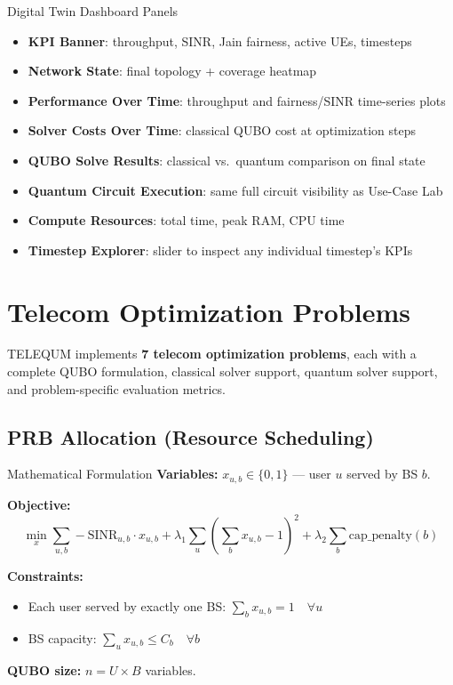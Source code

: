 \documentclass[11pt,a4paper]{article}
\begin{document}
\begin{featurebox}{Digital Twin Dashboard Panels}
\begin{itemize}
  \item \textbf{KPI Banner}: throughput, SINR, Jain fairness, active UEs, timesteps
  \item \textbf{Network State}: final topology + coverage heatmap
  \item \textbf{Performance Over Time}: throughput and fairness/SINR time-series plots
  \item \textbf{Solver Costs Over Time}: classical QUBO cost at optimization steps
  \item \textbf{QUBO Solve Results}: classical vs.\ quantum comparison on final state
  \item \textbf{Quantum Circuit Execution}: same full circuit visibility as Use-Case Lab
  \item \textbf{Compute Resources}: total time, peak RAM, CPU time
  \item \textbf{Timestep Explorer}: slider to inspect any individual timestep's KPIs
\end{itemize}
\end{featurebox}


\section{Telecom Optimization Problems}
\label{sec:problems}

TELEQUM implements \textbf{7 telecom optimization problems}, each with a complete QUBO formulation, classical solver support, quantum solver support, and problem-specific evaluation metrics.

\subsection{PRB Allocation (Resource Scheduling)}

\begin{mathbox}{Mathematical Formulation}
\textbf{Variables:} $x_{u,b} \in \{0,1\}$ — user $u$ served by BS $b$.

\textbf{Objective:}
$$\min_{x} \sum_{u,b} -\text{SINR}_{u,b} \cdot x_{u,b} + \lambda_1 \sum_u \left(\sum_b x_{u,b} - 1\right)^2 + \lambda_2 \sum_b \text{cap\_penalty}(b)$$

\textbf{Constraints:}
\begin{itemize}[nosep]
  \item Each user served by exactly one BS: $\sum_b x_{u,b} = 1 \quad \forall u$
  \item BS capacity: $\sum_u x_{u,b} \leq C_b \quad \forall b$
\end{itemize}

\textbf{QUBO size:} $n = U \times B$ variables.
\end{mathbox}
\end{document}
